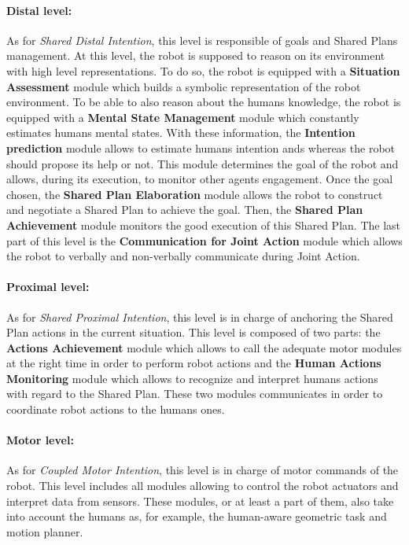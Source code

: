 \documentclass[english,a4paper,11pt,twoside]{StyleThese}
\begin{document}
\paragraph{Distal level:}
As for \textit{Shared Distal Intention}, this level is responsible of goals and Shared Plans management. At this level, the robot is supposed to reason on its environment with high level representations. To do so, the robot is equipped with a \textbf{Situation Assessment} module which builds a symbolic representation of the robot environment. To be able to also reason about the humans knowledge, the robot is equipped with a \textbf{Mental State Management} module which constantly estimates humans mental states. With these information, the \textbf{Intention prediction} module allows to estimate humans intention ands whereas the robot should propose its help or not. This module determines the goal of the robot and allows, during its execution, to monitor other agents engagement. Once the goal chosen, the \textbf{Shared Plan Elaboration} module allows the robot to construct and negotiate a Shared Plan to achieve the goal. Then, the \textbf{Shared Plan Achievement} module monitors the good execution of this Shared Plan. The last part of this level is the \textbf{Communication for Joint Action} module which allows the robot to verbally and non-verbally communicate during Joint Action. 

\paragraph{Proximal level:}
As for \textit{Shared Proximal Intention}, this level is in charge of anchoring the Shared Plan actions in the current situation. This level is composed of two parts: the \textbf{Actions Achievement} module which allows to call the adequate motor modules at the right time in order to perform robot actions and the \textbf{Human Actions Monitoring} module which allows to recognize and interpret humans actions with regard to the Shared Plan. These two modules communicates in order to coordinate robot actions to the humans ones.

\paragraph{Motor level:}
As for \textit{Coupled Motor Intention}, this level is in charge of motor commands of the robot. This level includes all modules allowing to control the robot actuators and interpret data from sensors. These modules, or at least a part of them, also take into account the humans as, for example, the human-aware geometric task and motion planner.

\ifdefined{}
\else


\end{document}
